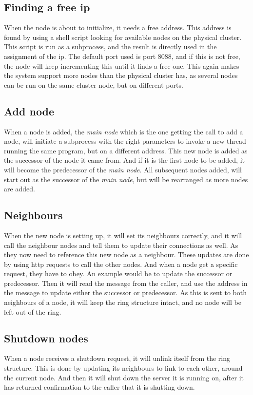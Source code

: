 \subsection{Finding a free ip}
When the node is about to initialize, it needs a free address. This address is found by using a shell script looking for available nodes on the physical cluster. This script is run as a subprocess, and the result is directly used in the assignment of the ip. The default port used is port 8088, and if this is not free, the node will keep incrementing this until it finds a free one. This again makes the system support more nodes than the physical cluster has, as several nodes can be run on the same cluster node, but on different ports.

\subsection{Add node}
When a node is added, the \emph{main node} which is the one getting the call to add a node, will initiate a subprocess with the right parameters to invoke a new thread running the same program, but on a different address. This new node is added as the successor of the node it came from. And if it is the first node to be added, it will become the predecessor of the \emph{main node}. All subsequent nodes added, will start out as the successor of the \emph{main node}, but will be rearranged as more nodes are added.

\subsection{Neighbours}
When the new node is setting up, it will set its neighbours correctly, and it will call the neighbour nodes and tell them to update their connections as well. As they now need to reference this new node as a neighbour. These updates are done by using http requests to call the other nodes. And when a node get a specific request, they have to obey. An example would be to update the successor or predecessor. Then it will read the message from the caller, and use the address in the message to update either the successor or predecessor. As this is sent to both neighbours of a node, it will keep the ring structure intact, and no node will be left out of the ring.

\subsection{Shutdown nodes}
When a node receives a shutdown request, it will unlink itself from the ring structure. This is done by updating its neighbours to link to each other, around the current node. And then it will shut down the server it is running on, after it has returned confirmation to the caller that it is shutting down.


